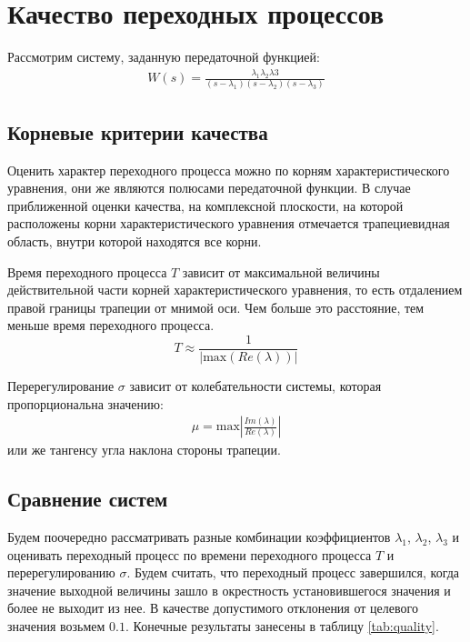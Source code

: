 \section{Качество переходных процессов}

Рассмотрим систему, заданную передаточной функцией:
\begin{eqnarray}
    W(s) = \frac{\lambda_1\lambda_2\lambda3}{(s-\lambda_1)(s-\lambda_2)(s-\lambda_3)}
\end{eqnarray}

\subsection{Корневые критерии качества}
Оценить характер переходного процесса можно по корням характеристического уравнения, они 
же являются полюсами передаточной функции. В случае приближенной оценки качества, на 
комплексной плоскости, на которой расположены корни характеристического уравнения 
отмечается трапециевидная область, внутри которой находятся все корни. 

Время переходного процесса $T$ зависит от максимальной величины действительной части 
корней характеристического уравнения, то есть отдалением правой границы трапеции от 
мнимой оси. Чем больше это расстояние, тем меньше время переходного процесса. 
\begin{equation}
    T \approx \frac{1}{|\text{max}(Re(\lambda))|}
\end{equation}

Перерегулирование $\sigma$ зависит от колебательности системы, которая пропорциональна значению:
\begin{eqnarray}
    \mu = \text{max}\left|\frac{Im(\lambda)}{Re(\lambda)}\right|
\end{eqnarray}
или же тангенсу угла наклона стороны трапеции. 

\FloatBarrier
\subsection{Сравнение систем}
Будем поочередно рассматривать разные комбинации коэффициентов $\lambda_1$, $\lambda_2$, $\lambda_3$ 
и оценивать переходный процесс по времени переходного процесса $T$ и перерегулированию $\sigma$. 
Будем считать, что переходный процесс завершился, когда значение выходной величины
зашло в окрестность установившегося значения и более не выходит из нее. В качестве допустимого 
отклонения от целевого значения возьмем $0.1$.
Конечные результаты занесены в таблицу \ref{tab:quality}. 

